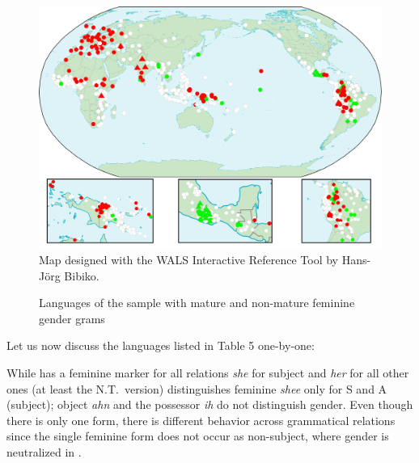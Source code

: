 \documentclass[output=collectionpaper]{langsci/langscibook}
\begin{document}
\begin{figure}
\includegraphics[width=\textwidth]{figures/12/map.png}
{\small Map designed with the WALS Interactive Reference Tool by Hans-Jörg Bibiko.}
\caption{Languages of the sample with mature and non-mature feminine gender grams}
\label{fig:BW:1}
\end{figure}

Let us now discuss the languages listed in Table 5 one-by-one:

While  has a feminine marker for all relations \textendash{} \textit{she} for subject and \textit{her} for all other ones \textendash{}  (at least the N.T.\ version) distinguishes feminine \textit{shee} only for S and A (subject); object \textit{ahn} and the possessor \textit{ih} do not distinguish gender. Even though there is only one form, there is different behavior across grammatical relations since the single feminine form does not occur as non-subject, where gender is neutralized in .
\end{document}
